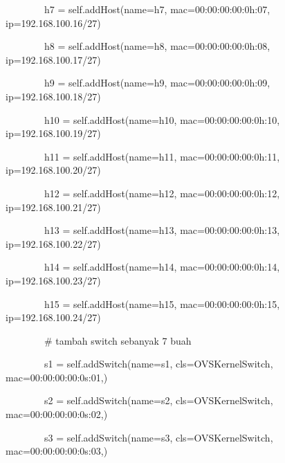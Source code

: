 \ \ \ \ \ \ \ \ h7 = self.addHost(name={\textquotedbl}h7{\textquotedbl},
mac={\textquotedbl}00:00:00:00:0h:07{\textquotedbl}, ip={\textquotedbl}192.168.100.16/27{\textquotedbl})

\ \ \ \ \ \ \ \ h8 = self.addHost(name={\textquotedbl}h8{\textquotedbl},
mac={\textquotedbl}00:00:00:00:0h:08{\textquotedbl}, ip={\textquotedbl}192.168.100.17/27{\textquotedbl})

\ \ \ \ \ \ \ \ h9 = self.addHost(name={\textquotedbl}h9{\textquotedbl},
mac={\textquotedbl}00:00:00:00:0h:09{\textquotedbl}, ip={\textquotedbl}192.168.100.18/27{\textquotedbl})

\ \ \ \ \ \ \ \ h10 = self.addHost(name={\textquotedbl}h10{\textquotedbl},
mac={\textquotedbl}00:00:00:00:0h:10{\textquotedbl}, ip={\textquotedbl}192.168.100.19/27{\textquotedbl})

\ \ \ \ \ \ \ \ h11 = self.addHost(name={\textquotedbl}h11{\textquotedbl},
mac={\textquotedbl}00:00:00:00:0h:11{\textquotedbl}, ip={\textquotedbl}192.168.100.20/27{\textquotedbl})

\ \ \ \ \ \ \ \ h12 = self.addHost(name={\textquotedbl}h12{\textquotedbl},
mac={\textquotedbl}00:00:00:00:0h:12{\textquotedbl}, ip={\textquotedbl}192.168.100.21/27{\textquotedbl})

\ \ \ \ \ \ \ \ h13 = self.addHost(name={\textquotedbl}h13{\textquotedbl},
mac={\textquotedbl}00:00:00:00:0h:13{\textquotedbl}, ip={\textquotedbl}192.168.100.22/27{\textquotedbl})

\ \ \ \ \ \ \ \ h14 = self.addHost(name={\textquotedbl}h14{\textquotedbl},
mac={\textquotedbl}00:00:00:00:0h:14{\textquotedbl}, ip={\textquotedbl}192.168.100.23/27{\textquotedbl})

\ \ \ \ \ \ \ \ h15 = self.addHost(name={\textquotedbl}h15{\textquotedbl},
mac={\textquotedbl}00:00:00:00:0h:15{\textquotedbl}, ip={\textquotedbl}192.168.100.24/27{\textquotedbl})

\bigskip

\ \ \ \ \ \ \ \ \# tambah switch sebanyak 7 buah

\ \ \ \ \ \ \ \ s1 = self.addSwitch(name={\textquotedbl}s1{\textquotedbl}, cls=OVSKernelSwitch,
mac={\textquotedbl}00:00:00:00:0s:01{\textquotedbl},)

\ \ \ \ \ \ \ \ s2 = self.addSwitch(name={\textquotedbl}s2{\textquotedbl}, cls=OVSKernelSwitch,
mac={\textquotedbl}00:00:00:00:0s:02{\textquotedbl},)

\ \ \ \ \ \ \ \ s3 = self.addSwitch(name={\textquotedbl}s3{\textquotedbl}, cls=OVSKernelSwitch,
mac={\textquotedbl}00:00:00:00:0s:03{\textquotedbl},)

